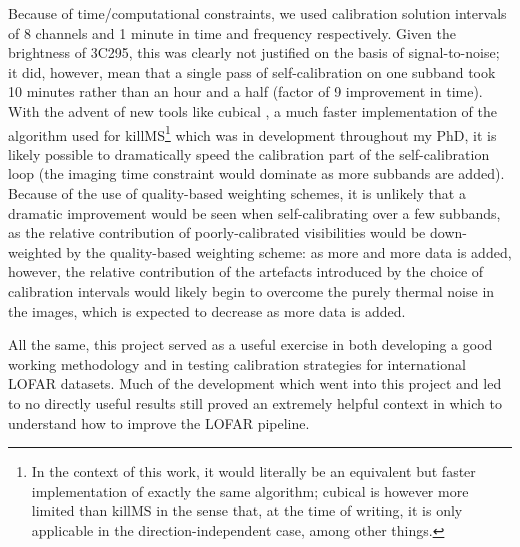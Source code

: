 \pg
Because of time/computational constraints, we used calibration solution intervals of 8 channels and 1 minute in time and frequency respectively. Given the brightness of 3C295, this was clearly not justified on the basis of signal-to-noise; it did, however, mean that a single pass of self-calibration on one subband took 10 minutes rather than an hour and a half (factor of 9 improvement in time). With the advent of new tools like cubical , a much faster implementation of the algorithm used for killMS\footnote{In the context of this work, it would literally be an equivalent but faster implementation of exactly the same algorithm; cubical is however more limited than killMS in the sense that, at the time of writing, it is only applicable in the direction-independent case, among other things.} which was in development throughout my PhD, it is likely possible to dramatically speed the calibration part of the self-calibration loop (the imaging time constraint would dominate as more subbands are added). Because of the use of quality-based weighting schemes, it is unlikely that a dramatic improvement would be seen when self-calibrating over a few subbands, as the relative contribution of poorly-calibrated visibilities would be down-weighted by the quality-based weighting scheme: as more and more data is added, however, the relative contribution of the artefacts introduced by the choice of calibration intervals would likely begin to overcome the purely thermal noise in the images, which is expected to decrease as more data is added.%

\pg
All the same, this project served as a useful exercise in both developing a good working methodology and in testing calibration strategies for international LOFAR datasets. Much of the development which went into this project and led to no directly useful results still proved an extremely helpful context in which to understand how to improve the LOFAR pipeline.

%
%
%
%
%
